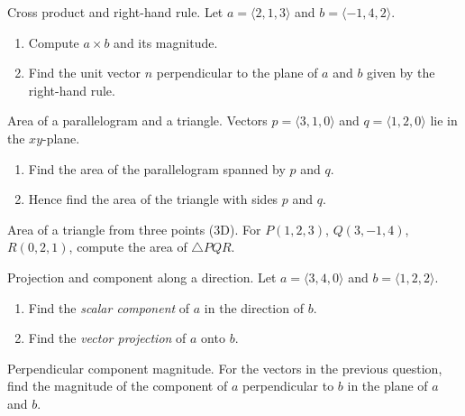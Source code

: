 \documentclass[11pt]{article}
\def\textbf#1{#1}%
\def\mathbf#1{#1}%
\newcounter{question}
\begin{document}
\begin{question}
\textbf{Cross product and right-hand rule.}
Let \(\mathbf{a}=\langle 2,1,3\rangle\) and \(\mathbf{b}=\langle -1,4,2\rangle\).
\begin{enumerate}
  \item Compute \(\mathbf{a}\times\mathbf{b}\) and its magnitude.
  \item Find the unit vector \(\mathbf{n}\) perpendicular to the plane of \(\mathbf{a}\) and \(\mathbf{b}\) given by the right-hand rule.
\end{enumerate}
\end{question}

\begin{question}
\textbf{Area of a parallelogram and a triangle.}
Vectors \(\mathbf{p}=\langle 3,1,0\rangle\) and \(\mathbf{q}=\langle 1,2,0\rangle\) lie in the \(xy\)-plane.
\begin{enumerate}
  \item Find the area of the parallelogram spanned by \(\mathbf{p}\) and \(\mathbf{q}\).
  \item Hence find the area of the triangle with sides \(\mathbf{p}\) and \(\mathbf{q}\).
\end{enumerate}
\end{question}

\begin{question}
\textbf{Area of a triangle from three points (3D).}
For \(P(1,2,3)\), \(Q(3,-1,4)\), \(R(0,2,1)\), compute the area of \(\triangle PQR\).
\end{question}

\begin{question}
\textbf{Projection and component along a direction.}
Let \(\mathbf{a}=\langle 3,4,0\rangle\) and \(\mathbf{b}=\langle 1,2,2\rangle\).
\begin{enumerate}
  \item Find the \emph{scalar component} of \(\mathbf{a}\) in the direction of \(\mathbf{b}\).
  \item Find the \emph{vector projection} of \(\mathbf{a}\) onto \(\mathbf{b}\).
\end{enumerate}
\end{question}

\begin{question}
\textbf{Perpendicular component magnitude.}
For the vectors in the previous question, find the magnitude of the component of \(\mathbf{a}\) perpendicular to \(\mathbf{b}\) in the plane of \(\mathbf{a}\) and \(\mathbf{b}\).
\end{question}
\end{document}
